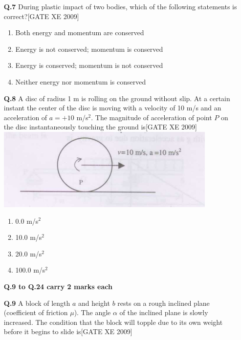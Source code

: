 \documentclass[journal,12pt,onecolumn]{IEEEtran}
\theoremstyle{remark}
\begin{document}
\begin{enumerate}
\vspace{0.3cm}

\item[\textbf{Q.7}] During plastic impact of two bodies, which of the following statements is correct?\hfill[GATE XE 2009]\\
\begin{multicols}{2}
\begin{enumerate}
    \item Both energy and momentum are conserved
    \item Energy is not conserved; momentum is conserved
    \item Energy is conserved; momentum is not conserved
    \item Neither energy nor momentum is conserved
\end{enumerate}
\end{multicols}


\vspace{0.3cm}

\item[\textbf{Q.8}] A disc of radius 1 m is rolling on the ground without slip. At a certain instant the center of the disc is moving with a velocity of 10 m/s and an acceleration of $a = + 10$ m/s$^2$. The magnitude of acceleration of point $P$ on the disc instantaneously touching the ground is\hfill[GATE XE 2009]\\

   \includegraphics[width=0.5\columnwidth]{figs/fig10.png}



\begin{multicols}{2}
\begin{enumerate}
    \item 0.0 m/s$^2$
    \item 10.0 m/s$^2$
    \item 20.0 m/s$^2$
    \item 100.0 m/s$^2$
\end{enumerate}
\end{multicols}


\bigskip
\Large\textbf{Q.9 to Q.24 carry 2 marks each}
\item[\textbf{Q.9}] A block of length $a$ and height $b$ rests on a rough inclined plane (coefficient of friction $\mu$). The angle $\alpha$ of the inclined plane is slowly increased. The condition that the block will topple due to its own weight before it begins to slide is\hfill[GATE XE 2009]\\


\end{enumerate}
\end{document}
